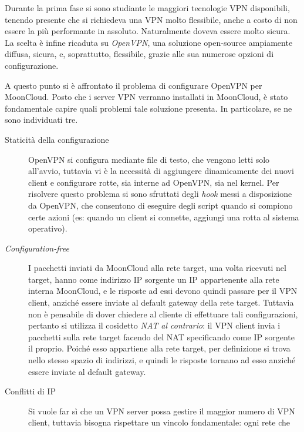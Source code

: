 \documentclass[10pt,a4paper]{article}
\begin{document}
        
        Durante la prima fase si sono studiante le maggiori tecnologie VPN disponibili,
        tenendo presente che si richiedeva una VPN molto flessibile, anche a costo
        di non essere la più performante in assoluto. Naturalmente doveva essere
        molto sicura. La scelta è infine ricaduta su \textit{OpenVPN}, una soluzione open-source
        ampiamente diffusa, sicura, e, soprattutto, flessibile, grazie alle sua numerose
        opzioni di configurazione.


        A questo punto si è affrontato il problema di configurare OpenVPN per
        MoonCloud. Posto che i server VPN verranno installati in MoonCloud, è stato
        fondamentale capire quali problemi tale soluzione
        presenta. In particolare, se ne sono individuati tre.
        \begin{description}
            \item[Staticità della configurazione]OpenVPN si configura mediante
            file di testo, che vengono letti solo all'avvio, tuttavia vi è la necessità
            di aggiungere dinamicamente dei nuovi client e configurare
            rotte, sia interne ad OpenVPN, sia nel kernel.
            Per risolvere questo problema
            si sono sfruttati degli \textit{hook} messi a disposizione da OpenVPN, che
            consentono di eseguire degli script quando si compiono certe azioni
            (es: quando un client si connette, aggiungi una rotta al sistema operativo).
            \item[\textit{Configuration-free}]I pacchetti inviati da MoonCloud alla rete
            target, una volta ricevuti nel target, hanno come indirizzo IP sorgente un IP appartenente
            alla rete interna MoonCloud, e le risposte ad essi devono quindi passare
            per il VPN client, anziché essere inviate al default gateway della rete target.
            Tuttavia non è pensabile di dover chiedere al cliente di effettuare tali configurazioni,
            pertanto si utilizza il cosidetto \textit{NAT al contrario}: il VPN
            client invia i pacchetti sulla rete target facendo del NAT specificando come IP sorgente
            il proprio. Poiché esso appartiene alla rete target, per definizione si trova
            nello stesso spazio di indirizzi, e quindi le risposte tornano ad esso anziché essere
            inviate al default gateway.
            \item[Conflitti di IP]Si vuole far sì che un VPN server possa gestire il maggior numero
            di VPN client, tuttavia bisogna rispettare un vincolo fondamentale: ogni rete che

\end{description}
\end{document}
